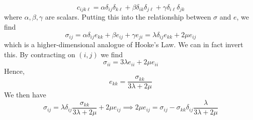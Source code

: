 \[ c_{ijk\ell} = \alpha \delta_{ij}\delta_{k\ell} + \beta \delta_{ik}\delta_{j\ell} + \gamma \delta_{i\ell}\delta_{jk} \]
where $\alpha, \beta, \gamma$ are scalars. Putting this into the relationship between $\sigma$ and $e$, we find
\[ \sigma_{ij} = \alpha \delta_{ij}e_{kk} + \beta e_{ij} + \gamma e_{ji} = \lambda \delta_{ij} e_{kk} + 2\mu e_{ij} \]
which is a higher-dimensional analogue of Hooke's Law. We can in fact invert this. By contracting on $(i, j)$ we find
\[ \sigma_{ii} = 3\lambda e_{ii} + 2\mu e_{ii} \]
Hence,
\[ e_{kk} = \frac{\sigma_{kk}}{3\lambda + 2\mu} \]
We then have
\[ \sigma_{ij} = \lambda \delta_{ij} \frac{\sigma_{kk}}{3\lambda + 2\mu} + 2\mu e_{ij} \implies 2\mu e_{ij} = \sigma_{ij} - \sigma_{kk} \delta_{ij} \frac{\lambda}{3\lambda + 2\mu} \]
